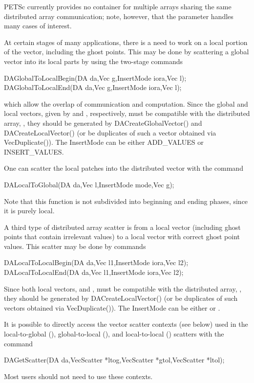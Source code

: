 PETSc currently provides no container for multiple arrays sharing the
same distributed array communication; note, however, that the 
parameter handles many cases of interest.

At certain stages of many applications, there is a need to work 
on a local portion of the vector, including the ghost points. 
This may be done by scattering a global vector into its 
local parts by using the two-stage commands
\begin{tabbing}
  DAGlobalToLocalBegin(DA da,Vec g,InsertMode iora,Vec l);\\
  DAGlobalToLocalEnd(DA da,Vec g,InsertMode iora,Vec l);
\end{tabbing}
which allow the overlap of communication and computation.
Since the global and local vectors, given by  and , respectively,
must be compatible with the distributed array, , they should be
generated by DACreateGlobalVector() 
and DACreateLocalVector()
(or be duplicates of such a vector obtained via VecDuplicate()).
The InsertMode can be either ADD_VALUES or INSERT_VALUES.

One can scatter the local patches into the distributed vector
with the command
\begin{tabbing}
  DALocalToGlobal(DA da,Vec l,InsertMode mode,Vec g);
\end{tabbing}
Note that this function is not
subdivided into beginning and ending phases, since it is purely local.

A third type of distributed array scatter is from a local
vector (including ghost points that contain irrelevant values) to 
a local vector with correct ghost point values. 
This scatter may be done by
commands
\begin{tabbing}
  DALocalToLocalBegin(DA da,Vec l1,InsertMode iora,Vec l2);\\
  DALocalToLocalEnd(DA da,Vec l1,InsertMode iora,Vec l2);
\end{tabbing}
Since both local vectors,  and ,
must be compatible with the distributed array, , they should be
generated by DACreateLocalVector()
(or be duplicates of such vectors obtained via VecDuplicate()).
The InsertMode can be either  or .

It is possible to directly access the vector scatter contexts (see below)
used in the local-to-global (), global-to-local 
(), and local-to-local ()
scatters with the command
\begin{tabbing}
  DAGetScatter(DA da,VecScatter *ltog,VecScatter *gtol,VecScatter *ltol);
\end{tabbing}
Most users should not need to use these contexts.


